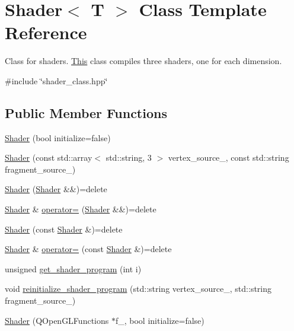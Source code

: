 \hypertarget{classShader}{}\section{Shader$<$ T $>$ Class Template Reference}
\label{classShader}


Class for shaders. \mbox{\hyperlink{classThis}{This}} class compiles three shaders, one for each dimension.  




{\ttfamily \#include \char`\"{}shader\+\_\+class.\+hpp\char`\"{}}

\subsection*{Public Member Functions}
\begin{DoxyCompactItemize}
\item 
\mbox{\hyperlink{classShader_a2b6e07575dcdc2fda5fbf6996a69345b}{Shader}} (bool initialize=false)
\item 
\mbox{\hyperlink{classShader_ae93db4f8280ee456ca13eaa7b9c47ec5}{Shader}} (const std\+::array$<$ std\+::string, 3 $>$ vertex\+\_\+source\+\_\+, const std\+::string fragment\+\_\+source\+\_\+)
\item 
\mbox{\hyperlink{classShader_a7e30078f161d1c9f48a7b3921c01f816}{Shader}} (\mbox{\hyperlink{classShader}{Shader}} \&\&)=delete
\item 
\mbox{\hyperlink{classShader}{Shader}} \& \mbox{\hyperlink{classShader_a3b92fece66095389581a2bf6b3124657}{operator=}} (\mbox{\hyperlink{classShader}{Shader}} \&\&)=delete
\item 
\mbox{\hyperlink{classShader_a49b2a448a00b5e1413c17501f8873cca}{Shader}} (const \mbox{\hyperlink{classShader}{Shader}} \&)=delete
\item 
\mbox{\hyperlink{classShader}{Shader}} \& \mbox{\hyperlink{classShader_a58f724fecccecdb1633e08ce0258da37}{operator=}} (const \mbox{\hyperlink{classShader}{Shader}} \&)=delete
\item 
unsigned \mbox{\hyperlink{classShader_a2c19b216850480109f9d5f7ed6ab6aa6}{get\+\_\+shader\+\_\+program}} (int i)
\item 
void \mbox{\hyperlink{classShader_a519cf95dff88c4da52ab6a4c3494b441}{reinitialize\+\_\+shader\+\_\+program}} (std\+::string vertex\+\_\+source\+\_\+, std\+::string fragment\+\_\+source\+\_\+)
\item 
\mbox{\hyperlink{classShader_a0da5865af1f708cd63a66f3fd8cd69b8}{Shader}} (Q\+Open\+G\+L\+Functions $\ast$f\+\_\+, bool initialize=false)

\end{DoxyCompactItemize}
